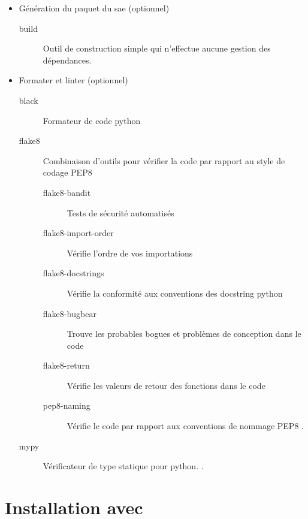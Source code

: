 \begin{itemize}
    \item Génération du \gls{paquet} du \gls{sae} (optionnel)
          \begin{description}
              \item[build] Outil de construction simple qui n'effectue aucune gestion des dépendances. \cite{build}
          \end{description}

    \item Formater et linter (optionnel)
          \begin{description}
              \item[black] Formateur de code \gls{python} \cite{black}
              \item[flake8] Combinaison d'outils pour vérifier la code par rapport au style de codage PEP8
                  \cite{flake8, pep8}
                  \begin{description}
                      \item[flake8-bandit] Tests de sécurité automatisés \cite{flake8_bandit}
                      \item[flake8-import-order] Vérifie l'ordre de vos importations \cite{flake8_import_order}
                      \item[flake8-docstrings] Vérifie la conformité aux conventions des \gls{docstring} \gls{python}
                          \cite{flake8_docstrings}
                      \item[flake8-bugbear] Trouve les probables bogues et problèmes de conception dans le code
                          \cite{flake8_bugbear}
                      \item[flake8-return] Vérifie les valeurs de retour des fonctions dans le code \cite{flake8_return}
                      \item[pep8-naming] Vérifie le code par rapport aux conventions de nommage PEP8 \cite{pep8_naming, pep8}.
                  \end{description}
              \item[mypy]
                  Vérificateur de type statique pour \gls{python}. \cite{mypy}.
          \end{description}
\end{itemize}


\section{Installation avec }

